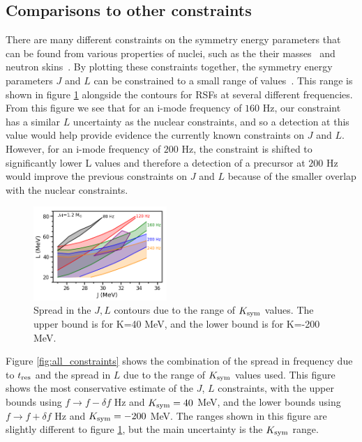 \documentclass[fleqn,usenatbib]{mnras}
\begin{document}
\subsection{Comparisons to other constraints}
\hspace{\parindent}There are many different constraints on the symmetry energy parameters that can be found from various properties of nuclei, such as the their masses~\citet{kortelainen2010nuclear} and neutron skins~\citet{chen2010density}. By plotting these constraints together, the symmetry energy parameters $J$ and $L$ can be constrained to a small range of values~\citet{balantekin2014nuclear}. This range is shown in figure \ref{fig:constraints} alongside the contours for RSFs at several different frequencies. From this figure we see that for an i-mode frequency of $160$ Hz, our constraint has a similar $L$ uncertainty as the nuclear constraints, and so a detection at this value would help provide evidence the currently known constraints on $J$ and $L$. However, for an i-mode frequency of $200$ Hz, the constraint is shifted to significantly lower L values and therefore a detection of a precursor at $200$ Hz would improve the previous constraints on $J$ and $L$ because of the smaller overlap with the nuclear constraints. %

\begin{figure}
\centering
\includegraphics[width=0.45\textwidth,angle=0]{JL_spread_due_to_Ksym_grid.png}
\caption{Spread in the $J,L$ contours due to the range of $K_{\rm sym}$ values. The upper bound is for K=40 MeV, and the lower bound is for K=-200 MeV.}
\label{fig:constraints}
\end{figure}

\hspace{\parindent}Figure \ref{fig:all_constraints} shows the combination of the spread in frequency due to $t_{\rm res}$ and the spread in $L$ due to the range of $K_{\rm sym}$ values used. This figure shows the most conservative estimate of the $J$, $L$ constraints, with the upper bounds using $f\rightarrow f-\delta f$ Hz and $K_{\rm sym}=40$ MeV, and the lower bounds using $f\rightarrow f+\delta f$ Hz and $K_{\rm sym}=-200$ MeV. The ranges shown in this figure are slightly different to figure \ref{fig:constraints}, but the main uncertainty is the $K_{\rm sym}$ range.
\end{document}
